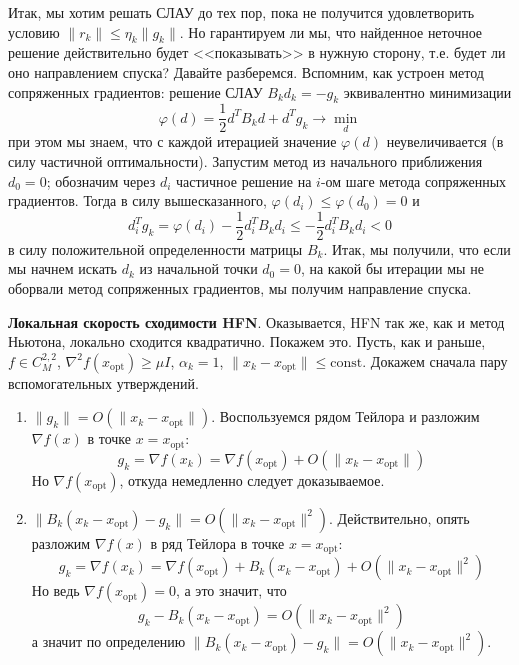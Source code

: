 \documentclass[a4paper, 12pt]{article}
\begin{document}
Итак, мы хотим решать СЛАУ до тех пор, пока не получится удовлетворить условию $\|r_k\| \leq \eta_k\|g_k\|$. Но гарантируем ли мы, что найденное неточное решение действительно будет <<показывать>> в нужную сторону, т.е. будет ли оно направлением спуска? Давайте разберемся. Вспомним, как устроен метод сопряженных градиентов: решение СЛАУ $B_kd_k = -g_k$ эквивалентно минимизации
$$\varphi(d) = \frac{1}{2}d^TB_kd + d^Tg_k \to \min_d$$
при этом мы знаем, что с каждой итерацией значение $\varphi(d)$ неувеличивается (в силу частичной оптимальности). Запустим метод из начального приближения $d_0 = 0$; обозначим через $d_i$ частичное решение на $i$-ом шаге метода сопряженных градиентов. Тогда в силу вышесказанного, $\varphi(d_i) \leq \varphi(d_0) = 0$ и 
$$d_i^Tg_k = \varphi(d_i) - \frac{1}{2}d_i^TB_kd_i \leq - \frac{1}{2}d_i^TB_kd_i < 0$$
в силу положительной определенности матрицы $B_k$. Итак, мы получили, что если мы начнем искать $d_k$ из начальной точки $d_0 = 0$, на какой бы итерации мы не оборвали метод сопряженных градиентов, мы получим направление спуска.

\textbf{Локальная скорость сходимости HFN}. Оказывается, HFN так же, как и метод Ньютона, локально сходится квадратично. Покажем это. Пусть, как и раньше, $f \in C^{2,2}_M$, $\nabla^2 f(x_{\mathrm{opt}}) \geq \mu I$, $\alpha_k = 1$, $\|x_k - x_{\mathrm{opt}}\| \leq \mathrm{const}$. Докажем сначала пару вспомогательных утверждений.

\begin{enumerate}
    \item $\|g_k\| = O(\|x_k - x_{\mathrm{opt}}\|)$. Воспользуемся рядом Тейлора и разложим $\nabla f(x)$ в точке $x = x_{\mathrm{opt}}$:
    $$g_k = \nabla f(x_k) = \nabla f(x_{\mathrm{opt}}) + O(\|x_k - x_{\mathrm{opt}}\|)$$
    Но $\nabla f(x_{\mathrm{opt}})$, откуда немедленно следует доказываемое.
    
    \item $\|B_k(x_k - x_{\mathrm{opt}}) - g_k\| = O(\|x_k - x_{\mathrm{opt}}\|^2)$. Действительно, опять разложим $\nabla f(x)$ в ряд Тейлора в точке $x = x_{\mathrm{opt}}$:
    $$
        g_k = \nabla f(x_k) = \nabla f(x_{\mathrm{opt}}) + B_k(x_k - x_{\mathrm{opt}}) + O(\|x_k - x_{\mathrm{opt}}\|^2) 
    $$
    Но ведь $\nabla f(x_{\mathrm{opt}}) = 0$, а это значит, что $$g_k - B_k(x_k - x_{\mathrm{opt}}) = O(\|x_k - x_{\mathrm{opt}}\|^2)$$ а значит по определению $\|B_k(x_k - x_{\mathrm{opt}}) - g_k\| = O(\|x_k - x_{\mathrm{opt}}\|^2)$.
    
\end{enumerate}
\end{document}
